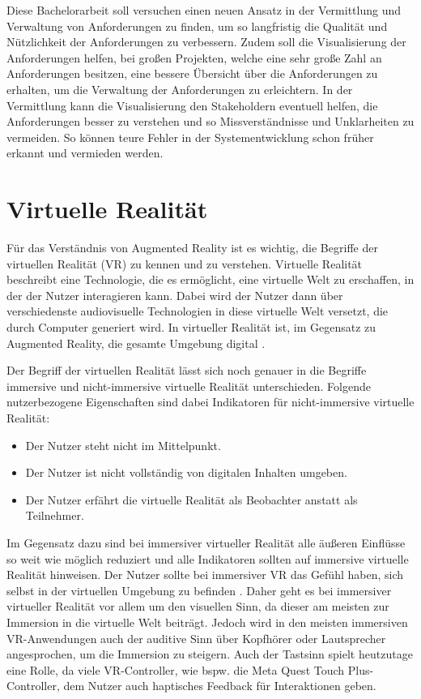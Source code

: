     Diese Bachelorarbeit soll versuchen einen neuen Ansatz in der Vermittlung und Verwaltung von Anforderungen zu finden, um so langfristig die Qualität und Nützlichkeit der Anforderungen zu verbessern.
    Zudem soll die Visualisierung der Anforderungen helfen, bei großen Projekten, welche eine sehr große Zahl an Anforderungen besitzen, eine bessere Übersicht über die Anforderungen zu erhalten, um die Verwaltung der Anforderungen zu erleichtern.
    In der Vermittlung kann die Visualisierung den Stakeholdern eventuell helfen, die Anforderungen besser zu verstehen und so Missverständnisse und Unklarheiten zu vermeiden.
    So können teure Fehler in der Systementwicklung schon früher erkannt und vermieden werden.
    


  \section{Virtuelle Realität}
  Für das Verständnis von Augmented Reality ist es wichtig, die Begriffe der virtuellen Realität (VR) zu kennen und zu verstehen.
  Virtuelle Realität beschreibt eine Technologie, die es ermöglicht, eine virtuelle Welt zu erschaffen, in der der Nutzer interagieren kann.
  Dabei wird der Nutzer dann über verschiedenste audiovisuelle Technologien in diese virtuelle Welt versetzt, die durch Computer generiert wird.
  In virtueller Realität ist, im Gegensatz zu Augmented Reality, die gesamte Umgebung digital
  \autocite[vgl.][S.15]{Dalton2023}.

  Der Begriff der virtuellen Realität lässt sich noch genauer in die Begriffe immersive und nicht-immersive virtuelle Realität unterschieden.
  Folgende nutzerbezogene Eigenschaften sind dabei Indikatoren für nicht-immersive virtuelle Realität:
  \begin{itemize}
    \item Der Nutzer steht nicht im Mittelpunkt.
    \item Der Nutzer ist nicht vollständig von digitalen Inhalten umgeben.
    \item Der Nutzer erfährt die virtuelle Realität als Beobachter anstatt als Teilnehmer.
  \end{itemize}
  Im Gegensatz dazu sind bei immersiver virtueller Realität alle äußeren Einflüsse so weit wie möglich reduziert und alle Indikatoren sollten auf immersive virtuelle Realität hinweisen.
  Der Nutzer sollte bei immersiver VR das Gefühl haben, sich selbst in der virtuellen Umgebung zu befinden \autocite[vgl.][S.23-24]{Wolfel2023}.
  Daher geht es bei immersiver virtueller Realität vor allem um den visuellen Sinn, da dieser am meisten zur Immersion in die virtuelle Welt beiträgt.
  Jedoch wird in den meisten immersiven VR-Anwendungen auch der auditive Sinn über Kopfhörer oder Lautsprecher angesprochen, um die Immersion zu steigern.
  Auch der Tastsinn spielt heutzutage eine Rolle, da viele VR-Controller, wie bspw. die Meta Quest Touch Plus-Controller, dem Nutzer auch haptisches Feedback für Interaktionen geben.

